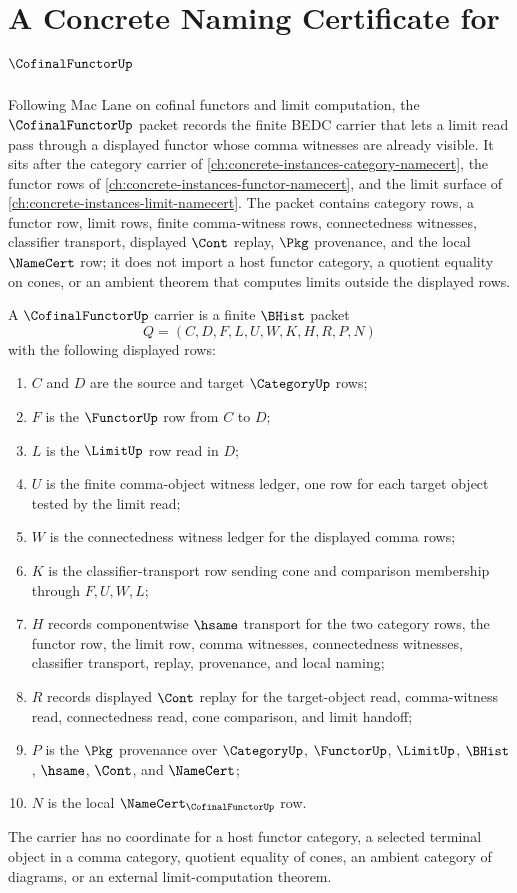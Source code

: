 \chapter{A Concrete Naming Certificate for $\CofinalFunctorUp$}
\label{ch:concrete-instances-cofinal-functor-namecert}

Following Mac Lane on cofinal functors and limit computation, the $\CofinalFunctorUp$ packet records the finite BEDC carrier that lets a limit read pass through a displayed functor whose comma witnesses are already visible. It sits after the category carrier of \autoref{ch:concrete-instances-category-namecert}, the functor rows of \autoref{ch:concrete-instances-functor-namecert}, and the limit surface of \autoref{ch:concrete-instances-limit-namecert}. The packet contains category rows, a functor row, limit rows, finite comma-witness rows, connectedness witnesses, classifier transport, displayed $\Cont$ replay, $\Pkg$ provenance, and the local $\NameCert$ row; it does not import a host functor category, a quotient equality on cones, or an ambient theorem that computes limits outside the displayed rows.

\begin{definition}
\label{def:cofinal-functor-carrier}
A $\CofinalFunctorUp$ carrier is a finite $\BHist$ packet
$$
Q=(C,D,F,L,U,W,K,H,R,P,N)
$$
with the following displayed rows:
\begin{enumerate}
\item $C$ and $D$ are the source and target $\CategoryUp$ rows;
\item $F$ is the $\FunctorUp$ row from $C$ to $D$;
\item $L$ is the $\LimitUp$ row read in $D$;
\item $U$ is the finite comma-object witness ledger, one row for each target object tested by the limit read;
\item $W$ is the connectedness witness ledger for the displayed comma rows;
\item $K$ is the classifier-transport row sending cone and comparison membership through $F,U,W,L$;
\item $H$ records componentwise $\hsame$ transport for the two category rows, the functor row, the limit row, comma witnesses, connectedness witnesses, classifier transport, replay, provenance, and local naming;
\item $R$ records displayed $\Cont$ replay for the target-object read, comma-witness read, connectedness read, cone comparison, and limit handoff;
\item $P$ is the $\Pkg$ provenance over $\CategoryUp$, $\FunctorUp$, $\LimitUp$, $\BHist$, $\hsame$, $\Cont$, and $\NameCert$;
\item $N$ is the local $\NameCert_{\CofinalFunctorUp}$ row.
\end{enumerate}
The carrier has no coordinate for a host functor category, a selected terminal object in a comma category, quotient equality of cones, an ambient category of diagrams, or an external limit-computation theorem.
\end{definition}

